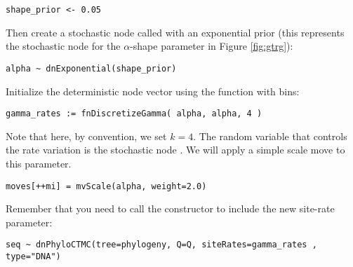 {\tt\begin{snugshade*}
\begin{lstlisting}
shape_prior <- 0.05                                                                             
\end{lstlisting}
\end{snugshade*}}

Then create a stochastic node called  with an exponential prior (this represents the stochastic node for the $\alpha$-shape parameter in Figure \ref{fig:gtrg}):
{\tt\begin{snugshade*}
\begin{lstlisting}
alpha ~ dnExponential(shape_prior)
\end{lstlisting}
\end{snugshade*}}

Initialize the  deterministic node vector using the   function with  bins:
{\tt \begin{snugshade*}
\begin{lstlisting}
gamma_rates := fnDiscretizeGamma( alpha, alpha, 4 )
\end{lstlisting}
\end{snugshade*}}

Note that here, by convention, we set $k = 4$.
The random variable that controls the rate variation is the stochastic node . 
We will apply a simple scale move to this parameter.
{\tt \begin{snugshade*}
\begin{lstlisting}
moves[++mi] = mvScale(alpha, weight=2.0)
\end{lstlisting}
\end{snugshade*}}

Remember that you need to call the  constructor to include the new site-rate parameter:
{\tt \begin{snugshade*}
\begin{lstlisting}
seq ~ dnPhyloCTMC(tree=phylogeny, Q=Q, siteRates=gamma_rates , type="DNA")
\end{lstlisting}
\end{snugshade*}}





